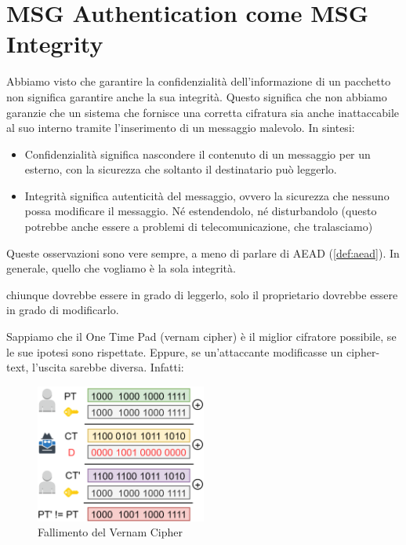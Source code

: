 \chapter{MSG Authentication come MSG Integrity}
Abbiamo visto che garantire la confidenzialità dell'informazione di un pacchetto non significa garantire anche la sua integrità. Questo significa che non abbiamo garanzie che un sistema che fornisce una corretta cifratura sia anche inattaccabile al suo interno tramite l'inserimento di un messaggio malevolo. In sintesi:
\begin{itemize}
    \item Confidenzialità significa nascondere il contenuto di un messaggio per un esterno, con la sicurezza che soltanto il destinatario può leggerlo.
    \item Integrità significa autenticità del messaggio, ovvero la sicurezza che nessuno possa modificare il messaggio. Né estendendolo, né disturbandolo (questo potrebbe anche essere a problemi di telecomunicazione, che tralasciamo)
\end{itemize}
Queste osservazioni sono vere sempre, a meno di parlare di AEAD (\ref{def:aead}). In generale, quello che vogliamo è la sola integrità. 
\begin{example}[ Il Curriculum] chiunque dovrebbe essere in grado di leggerlo, solo il proprietario dovrebbe essere in grado di modificarlo.
\end{example}
\begin{example}
Sappiamo che il One Time Pad (vernam cipher) è il miglior cifratore possibile, se le sue ipotesi sono rispettate. Eppure, se un'attaccante modificasse un cipher-text, l'uscita sarebbe diversa. Infatti:
\end{example}
\begin{figure}[H]
    \centering
    \includegraphics[width=0.5\textwidth]{image/vernaminteg.png}
    \caption{Fallimento del Vernam Cipher}
    \label{fig:vernamfail}
\end{figure}
